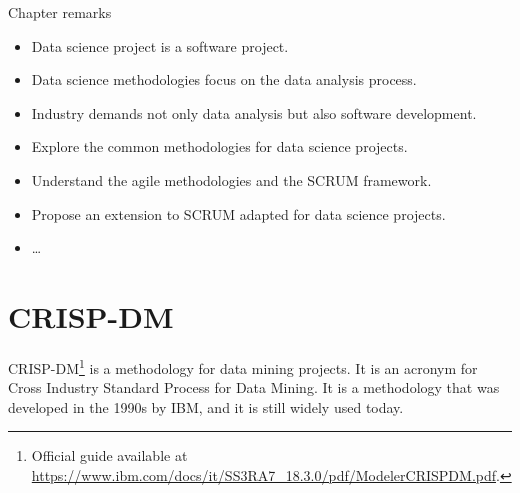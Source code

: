 \begin{mainbox}{Chapter remarks}


  \startcontents[chapters]
  \vspace{1em}


  \begin{itemize}
    \itemsep0em
    \item Data science project is a software project.
    \item Data science methodologies focus on the data analysis process.
    \item Industry demands not only data analysis but also software development.
  \end{itemize}


  \begin{itemize}
    \itemsep0em
    \item Explore the common methodologies for data science projects.
    \item Understand the agile methodologies and the SCRUM framework.
    \item Propose an extension to SCRUM adapted for data science projects.
  \end{itemize}


  \begin{itemize}
    \itemsep0em
    \item \dots
  \end{itemize}
\end{mainbox}

{}
\clearpage

\section{CRISP-DM}

CRISP-DM\footnote{Official guide available at
\url{https://www.ibm.com/docs/it/SS3RA7_18.3.0/pdf/ModelerCRISPDM.pdf}.} is a methodology
for data mining projects.  It is an acronym for Cross Industry Standard Process for Data
Mining.  It is a methodology that was developed in the 1990s by IBM, and it is still
widely used today.

